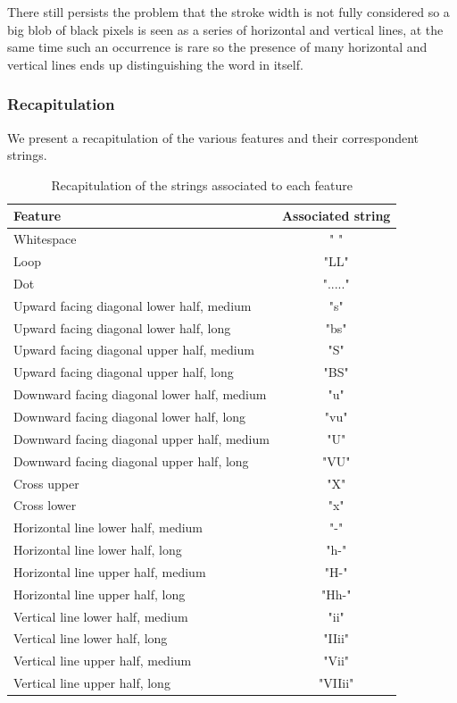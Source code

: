 There still persists the problem that the stroke width is not fully considered so a big blob of black pixels is seen as a series of horizontal and vertical lines, at the same time such an occurrence is rare so the presence of many horizontal and vertical lines ends up distinguishing the word in itself.    

\subsubsection*{Recapitulation}
We present a recapitulation of the various features and their correspondent strings.
\begin{table}[!htbp]
\centering
\footnotesize
\begin{tabular}{|l | c |} 
 \hline  \multicolumn{1}{|p{2cm}|}{\bfseries Feature}
 & \multicolumn{1}{p{2cm}|}{\centering\bfseries Associated string} \\ [0.5ex] 
 \hline\hline
 Whitespace & " " \\ \hline
 Loop & "LL"\\\hline
 Dot & "....."\\ \hline
 Upward facing diagonal lower half, medium & "s" \\ \hline
 Upward facing diagonal lower half, long & "bs"  \\\hline
 Upward facing diagonal upper half, medium & "S" \\ \hline
 Upward facing diagonal upper half, long & "BS" \\\hline
 Downward facing diagonal lower half, medium& "u"\\ \hline
 Downward facing diagonal lower half, long &"vu" \\ \hline
 Downward facing diagonal upper half, medium& "U" \\\hline
 Downward facing diagonal upper half, long &"VU" \\\hline
 Cross upper & "X"\\\hline
 Cross lower & "x"\\\hline
 Horizontal line lower half, medium & "-"\\\hline
  Horizontal line lower half, long & "h-"\\\hline
   Horizontal line upper half, medium & "H-"\\\hline
    Horizontal line upper half, long & "Hh-"\\\hline
 Vertical line lower half, medium & "ii"\\\hline
  Vertical line lower half, long & "IIii"\\\hline
   Vertical line upper half, medium & "Vii"\\\hline
    Vertical line upper half, long & "VIIii"\\ 
 \hline
\end{tabular}
\caption{Recapitulation of the strings associated to each feature}
\label{features}
\end{table}



